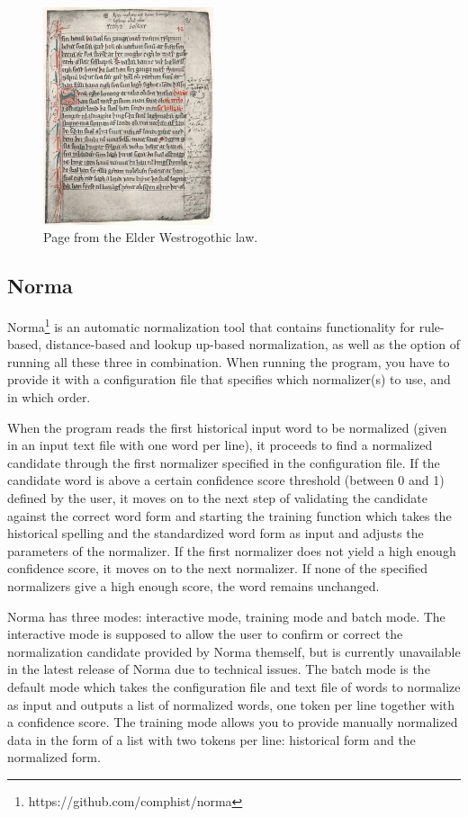 \documentclass[11pt,a4paper]{article}
\begin{document}
\begin{figure}[H]
\centering
\includegraphics[width=5cm]{images/vgl.jpg}
\caption{Page from the Elder Westrogothic law.}
\label{fig:mytree}
\end{figure}

\subsection{Norma} 

Norma\footnote{https://github.com/comphist/norma} \citep{bollmann:12} is an automatic normalization tool that contains functionality for rule-based, distance-based and lookup up-based normalization, as well as the option of running all these three in combination. When running the program, you have to provide it with a configuration file that specifies which normalizer(s) to use, and in which order. 

When the program reads the first historical input word to be normalized (given in an input text file with one word per line), it proceeds to find a normalized candidate through the first normalizer specified in the configuration file. If the candidate word is above a certain confidence score threshold (between 0 and 1) defined by the user, it moves on to the next step of validating the candidate against the correct word form and starting the training function which takes the historical spelling and the standardized word form as input and adjusts the parameters of the normalizer. If the first normalizer does not yield a high enough confidence score, it moves on to the next normalizer. If none of the specified normalizers give a high enough score, the word remains unchanged.         

Norma has three modes: interactive mode, training mode and batch mode. The interactive mode is supposed to allow the user to confirm or correct the normalization candidate provided by Norma themself, but is currently unavailable in the latest release of Norma due to technical issues. The batch mode is the default mode which takes the configuration file and text file of words to normalize as input and outputs a list of normalized words, one token per line together with a confidence score. The training mode allows you to provide manually normalized data in the form of a list with two tokens per line: historical form and the normalized form. 
\end{document}
